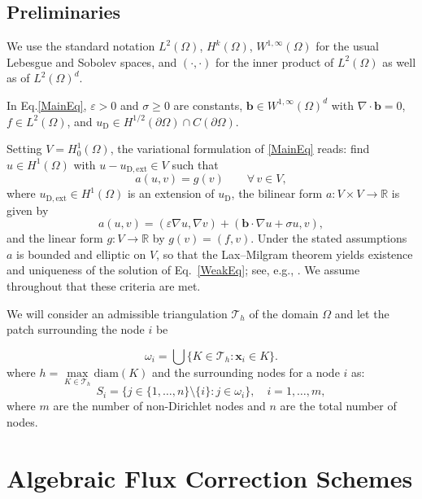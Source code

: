 \documentclass[a4paper]{article}
\theoremstyle{plain}
\theoremstyle{definition}
\theoremstyle{remark}
\begin{document}
\subsection{Preliminaries}
\label{sec:model}
We use the standard notation $L^2(\Omega)$, $H^k(\Omega)$, $W^{1,\infty}(\Omega)$ for the usual Lebesgue and Sobolev spaces, and $(\cdot,\cdot)$ for the inner product of $L^2(\Omega)$ as well as of $L^2(\Omega)^d$.

In Eq.\eqref{MainEq},  $\varepsilon>0$ and $\sigma\ge 0$ are constants,
$\boldsymbol{b}\in W^{1,\infty}(\Omega)^d$ with $\nabla\cdot\boldsymbol{b}=0$,
$f\in L^2(\Omega)$, and
$u_{\mathrm{D}}\in H^{1/2}(\partial\Omega)\cap C(\partial\Omega)$. 

Setting $V=H^1_0(\Omega)$, the variational formulation of \eqref{MainEq} reads: find
$u\in H^1(\Omega)$ with $u-u_{\mathrm{D},\mathrm{ext}}\in V$ such that
\begin{equation}
	a(u, v) = g(v) \qquad \forall\, v \in V,
	\label{WeakEq}
\end{equation}
where $u_{\mathrm{D},\mathrm{ext}}\in H^1(\Omega)$ is an extension of
$u_{\mathrm{D}}$, the bilinear form $a:V\times V\to\mathbb{R}$ is given by
\begin{equation*}
	a(u, v) = (\varepsilon \nabla u, \nabla v) + (\boldsymbol{b} \cdot \nabla u + \sigma u, v),
\end{equation*}
and the linear form $g:V\to\mathbb{R}$ by $g(v)=(f,v)$. Under the stated assumptions
$a$ is bounded and elliptic on $V$, so that the Lax--Milgram theorem yields existence
and uniqueness of the solution of Eq.~\eqref{WeakEq}; see, e.g.,
\cite{RST08}. We assume throughout that these criteria are met.


We will consider an admissible triangulation $\mathcal{T}_h$ of the domain $\Omega$ and let the patch surrounding the node $i$ be

\begin{equation}
\omega_i = \bigcup \{K \in \mathcal{T}_h : \mathbf{x}_i \in K\}.
\end{equation}
where $h = \max\limits_{K \in \mathcal{T}_h } \text{diam}(K) $ and the surrounding nodes for a node $i$ as:
\begin{equation}
	S_i = \{ j \in \{1, \dots, n\} \setminus \{i\} : j \in \omega_i \}, \quad i = 1, \dots, m, \label{eq:S_i}
\end{equation}
where $m$ are the number of non-Dirichlet nodes and $n$ are the total number of nodes.


\section{Algebraic Flux Correction Schemes}\label{sec:AFC}
\end{document}

